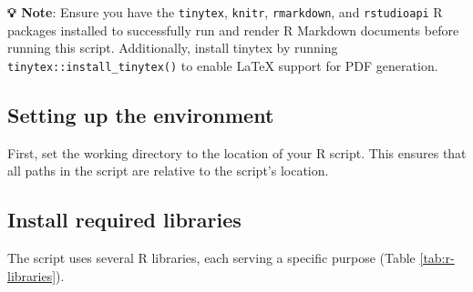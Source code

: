 \documentclass[
  10pt,
  b5paper,
  oneside]{book}
\newenvironment{Shaded}{\begin{snugshade}}{\end{snugshade}}
\newcommand{\CommentTok}[1]{\textcolor[rgb]{0.56,0.35,0.01}{\textit{#1}}}
\newcommand{\FunctionTok}[1]{\textcolor[rgb]{0.13,0.29,0.53}{\textbf{#1}}}
\newcommand{\NormalTok}[1]{#1}
\newcommand{\SpecialCharTok}[1]{\textcolor[rgb]{0.81,0.36,0.00}{\textbf{#1}}}
\newcommand{\StringTok}[1]{\textcolor[rgb]{0.31,0.60,0.02}{#1}}
\begin{document}
\textbf{💡 Note}: Ensure you have the \texttt{tinytex}, \texttt{knitr}, \texttt{rmarkdown}, and \texttt{rstudioapi} R packages installed to successfully run and render R Markdown documents before running this script. Additionally, install tinytex by running \texttt{tinytex::install\_tinytex()} to enable LaTeX support for PDF generation.

\subsection{Setting up the environment}\label{setup}

First, set the working directory to the location of your R script. This ensures that all paths in the script are relative to the script's location.

\begin{Shaded}
\end{Shaded}

\subsection{Install required libraries}\label{install-libraries}

The script uses several R libraries, each serving a specific purpose (Table \ref{tab:r-libraries}).
\end{document}
